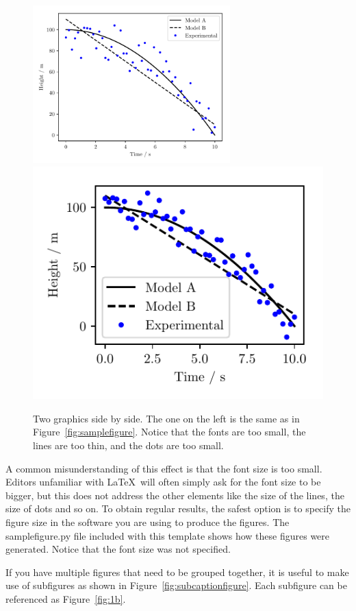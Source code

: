\begin{figure}[htbp]
  \centering
  \includegraphics[width=3in]{Figures/samplefigure.pdf}
  \includegraphics{Figures/samplefigure_halfsize.pdf}
  \caption{Two graphics side by side. The one on the left is the same as
    in Figure~\ref{fig:samplefigure}. Notice that the fonts are too small,
    the lines are too thin, and the dots are too small.}
  \label{fig:scalingexample}
\end{figure}

A common misunderstanding of this effect is that the font size is too small.
Editors unfamiliar with \LaTeX\ will often simply ask for the font size to be
bigger, but this does not address the other elements like the size of the lines,
the size of dots and so on. To obtain regular results, the safest option is to
specify the figure size in the software you are using to produce the figures.
The samplefigure.py file included with this template shows how these figures
were generated. Notice that the font size was not specified.

If you have multiple figures that need to be grouped together, it is useful to
make use of subfigures as shown in Figure~\ref{fig:subcaptionfigure}. Each
subfigure can be referenced as Figure~\ref{fig:1b}.


